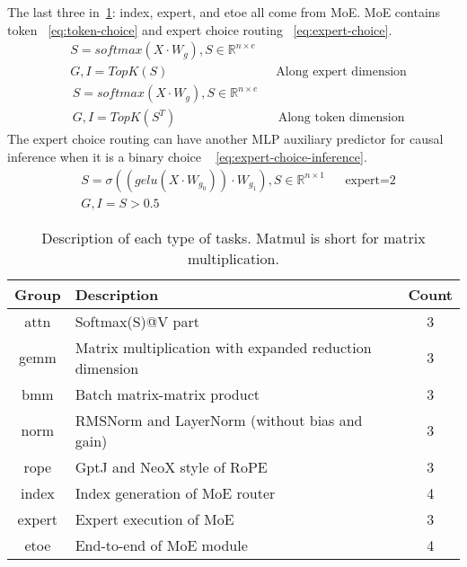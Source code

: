 The last three in~\cref{tab:task}: index, expert, and etoe all come from MoE. MoE contains token~\cite{shazeer2017outrageously} \cref{eq:token-choice} and expert choice routing~\cite{zhou2022mixture} \cref{eq:expert-choice}.
\begin{equation}
\begin{aligned}
    &S = softmax(X\cdot W_g), S\in \mathbb{R}^{n\times e} \\
    &G, I = TopK(S) && \text{Along expert dimension}
\end{aligned}
\label{eq:token-choice}
\end{equation}
\begin{equation}
\begin{aligned}
    &S = softmax(X\cdot W_g), S\in \mathbb{R}^{n\times e} \\
    &G, I = TopK(S^T) && \text{Along token dimension}
\end{aligned}
\label{eq:expert-choice}
\end{equation}
The expert choice routing can have another MLP auxiliary predictor for causal inference when it is a binary choice ~\cite{raposo2024mixture} \cref{eq:expert-choice-inference}.
\begin{equation}
\begin{aligned}
    &S = \sigma((gelu(X\cdot W_{g_0}))\cdot W_{g_1}), S\in \mathbb{R}^{n\times 1} && \text{expert=2}\\
    &G, I = S > 0.5
\end{aligned}
\label{eq:expert-choice-inference}
\end{equation}

\begin{table}[htb]
    \centering
    \begin{tabular}{c|l|c}
    \toprule
        Group & Description & Count \\
        \midrule
         attn & Softmax(S)@V part & 3 \\
         gemm & Matrix multiplication with expanded reduction dimension & 3 \\
         bmm & Batch matrix-matrix product& 3 \\
         norm & RMSNorm and LayerNorm (without bias and gain) & 3 \\
         rope & GptJ and NeoX style of RoPE & 3 \\
         index & Index generation of MoE router & 4 \\
         expert & Expert execution of MoE & 3 \\
         etoe & End-to-end of MoE module & 4 \\
        \bottomrule
         
    \end{tabular}
    \caption{Description of each type of tasks. Matmul is short for matrix multiplication.}
    \label{tab:task}
\end{table}

